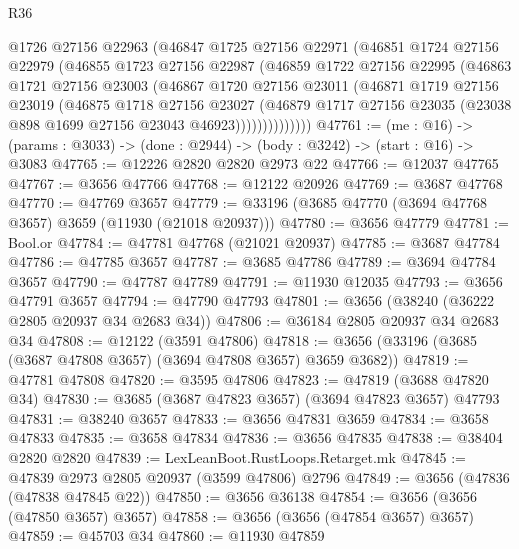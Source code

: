 \begin{lexlean}{R36}
\begin{coremodule}
            @1726
            @27156
            @22963
            (@46847
              @1725
              @27156
              @22971
              (@46851
                @1724
                @27156
                @22979
                (@46855
                  @1723
                  @27156
                  @22987
                  (@46859
                    @1722
                    @27156
                    @22995
                    (@46863
                      @1721
                      @27156
                      @23003
                      (@46867
                        @1720
                        @27156
                        @23011
                        (@46871
                          @1719
                          @27156
                          @23019
                          (@46875
                            @1718
                            @27156
                            @23027
                            (@46879
                              @1717
                              @27156
                              @23035
                              (@23038 @898 @1699 @27156 @23043 @46923))))))))))))))
@47761 := (me : @16) ->
  (params : @3033) -> (done : @2944) -> (body : @3242) -> (start : @16) -> @3083
@47765 := @12226 @2820 @2820 @2973 @22
@47766 := @12037 @47765
@47767 := @3656 @47766
@47768 := @12122 @20926
@47769 := @3687 @47768
@47770 := @47769 @3657
@47779 := @33196 (@3685 @47770 (@3694 @47768 @3657) @3659 (@11930 (@21018 @20937)))
@47780 := @3656 @47779
@47781 := Bool.or
@47784 := @47781 @47768 (@21021 @20937)
@47785 := @3687 @47784
@47786 := @47785 @3657
@47787 := @3685 @47786
@47789 := @3694 @47784 @3657
@47790 := @47787 @47789
@47791 := @11930 @12035
@47793 := @3656 @47791 @3657
@47794 := @47790 @47793
@47801 := @3656 (@38240 (@36222 @2805 @20937 @34 @2683 @34))
@47806 := @36184 @2805 @20937 @34 @2683 @34
@47808 := @12122 (@3591 @47806)
@47818 := @3656 (@33196 (@3685 (@3687 @47808 @3657) (@3694 @47808 @3657) @3659 @3682))
@47819 := @47781 @47808
@47820 := @3595 @47806
@47823 := @47819 (@3688 @47820 @34)
@47830 := @3685 (@3687 @47823 @3657) (@3694 @47823 @3657) @47793
@47831 := @38240 @3657
@47833 := @3656 @47831 @3659
@47834 := @3658 @47833
@47835 := @3658 @47834
@47836 := @3656 @47835
@47838 := @38404 @2820 @2820
@47839 := LexLeanBoot.RustLoops.Retarget.mk
@47845 := @47839 @2973 @2805 @20937 (@3599 @47806) @2796
@47849 := @3656 (@47836 (@47838 @47845 @22))
@47850 := @3656 @36138
@47854 := @3656 (@3656 (@47850 @3657) @3657)
@47858 := @3656 (@3656 (@47854 @3657) @3657)
@47859 := @45703 @34
@47860 := @11930 @47859

\end{coremodule}
\end{lexlean}
